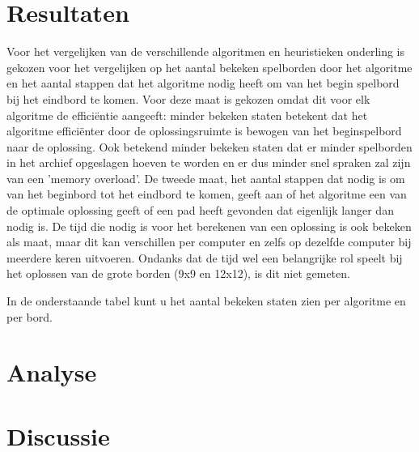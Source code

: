 \documentclass[a4paper]{article}
\begin{document}
\section{Resultaten}
Voor het vergelijken van de verschillende algoritmen en heuristieken onderling is gekozen voor het vergelijken op het aantal bekeken spelborden door het algoritme en het aantal stappen dat het algoritme nodig heeft om van het begin spelbord bij het eindbord te komen. Voor deze maat is gekozen omdat dit voor elk algoritme de efficiëntie aangeeft: minder bekeken staten betekent dat het algoritme efficiënter door de oplossingsruimte is bewogen van het beginspelbord naar de oplossing. Ook betekend minder bekeken staten dat er minder spelborden in het archief opgeslagen hoeven te worden en er dus minder snel spraken zal zijn van een 'memory overload'. De tweede maat, het aantal stappen dat nodig is om van het beginbord tot het eindbord te komen, geeft aan of het algoritme een van de optimale oplossing geeft of een pad heeft gevonden dat eigenlijk langer dan nodig is. De tijd die nodig is voor het berekenen van een oplossing is ook bekeken als maat, maar dit kan verschillen per computer en zelfs op dezelfde computer bij meerdere keren uitvoeren. Ondanks dat de tijd wel een belangrijke rol speelt bij het oplossen van de grote borden (9x9 en 12x12), is dit niet gemeten.

	In de onderstaande tabel kunt u het aantal bekeken staten zien per algoritme en per bord.

\section{Analyse}

\section{Discussie}

  



\end{document}

